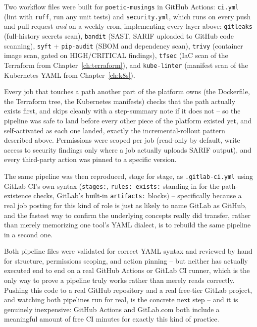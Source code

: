 \documentclass[11pt,twoside,openright]{book}
\begin{document}
\begin{caseStudy}
Two workflow files were built for \texttt{poetic-musings} in GitHub Actions:
\texttt{ci.yml} (lint with \texttt{ruff}, run any unit tests) and \texttt{security.yml},
which runs on every push and pull request \emph{and} on a weekly cron, implementing every
layer above: \texttt{gitleaks} (full-history secrets scan), \texttt{bandit} (SAST, SARIF
uploaded to GitHub code scanning), \texttt{syft} + \texttt{pip-audit} (SBOM and dependency
scan), \texttt{trivy} (container image scan, gated on HIGH/CRITICAL findings), \texttt{tfsec}
(IaC scan of the Terraform from Chapter~\ref{ch:terraform}), and \texttt{kube-linter}
(manifest scan of the Kubernetes YAML from Chapter~\ref{ch:k8s}).

Every job that touches a path another part of the platform owns (the Dockerfile, the
Terraform tree, the Kubernetes manifests) checks that the path actually exists first, and
skips cleanly with a step-summary note if it does not -- so the pipeline was safe to land
before every other piece of the platform existed yet, and self-activated as each one
landed, exactly the incremental-rollout pattern described above. Permissions were scoped
per job (read-only by default, write access to security findings only where a job actually
uploads SARIF output), and every third-party action was pinned to a specific version.

The same pipeline was then reproduced, stage for stage, as \texttt{.gitlab-ci.yml} using
GitLab CI's own syntax (\texttt{stages:}, \texttt{rules: exists:} standing in for the
path-existence checks, GitLab's built-in \texttt{artifacts:} blocks) -- specifically
because a real job posting for this kind of role is just as likely to name GitLab as
GitHub, and the fastest way to confirm the underlying concepts really did transfer, rather
than merely memorizing one tool's YAML dialect, is to rebuild the same pipeline in a second
one.
\end{caseStudy}

\begin{gap}
Both pipeline files were validated for correct YAML syntax and reviewed by hand for
structure, permissions scoping, and action pinning -- but neither has actually executed
end to end on a real GitHub Actions or GitLab CI runner, which is the only way to prove a
pipeline truly works rather than merely reads correctly. Pushing this code to a real GitHub
repository and a real free-tier GitLab project, and watching both pipelines run for real,
is the concrete next step -- and it is genuinely inexpensive: GitHub Actions and
GitLab.com both include a meaningful amount of free CI minutes for exactly this kind of
practice.
\end{gap}
\end{document}
